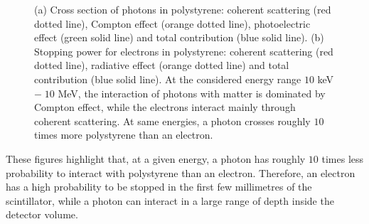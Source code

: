 \begin{figure}[h]
\begin{subfigure}[t]{0.48\textwidth}
  \captionsetup{justification=justified}
  \caption{
    \label{subfig:electron}}
\end{subfigure}
\caption{(a) Cross section of photons in polystyrene: coherent scattering (red dotted line), Compton effect (orange dotted line), photoelectric effect (green solid line) and total contribution (blue solid line).
  (b) Stopping power for electrons in polystyrene: coherent scattering (red dotted line), radiative effect (orange dotted line) and total contribution (blue solid line).
  At the considered energy range $10$ keV $ -\; 10$ MeV, the interaction of photons with matter is dominated by Compton effect, while the electrons interact mainly through coherent scattering.
  At same energies, a photon crosses roughly $10$ times more polystyrene than an electron.
  \label{fig:particle_attenuation}}
\end{figure}
These figures highlight that, at a given energy, a photon has roughly $10$ times less probability to interact with polystyrene than an electron.
Therefore, an electron has a high probability to be stopped in the first few millimetres of the scintillator, while a photon can interact in a large range of depth inside the detector volume.

